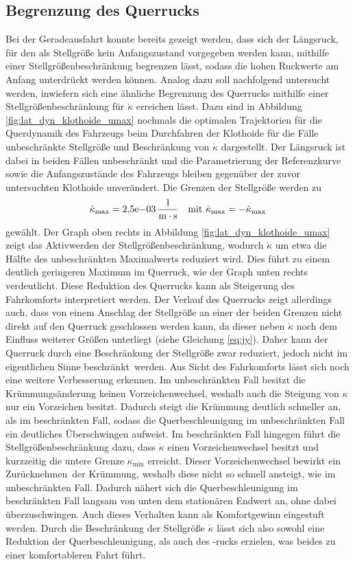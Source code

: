 \subsection{Begrenzung des Querrucks}
Bei der Geradeausfahrt konnte bereits gezeigt werden, dass sich der Längsruck, für den als Stellgröße kein Anfangszustand vorgegeben werden kann, mithilfe einer Stellgrößenbeschränkung begrenzen lässt, sodass die hohen Ruckwerte am Anfang unterdrückt werden können. Analog dazu soll nachfolgend untersucht werden, inwiefern sich eine ähnliche Begrenzung des Querrucks mithilfe einer Stellgrößenbeschränkung für $\dot{\kappa}$ erreichen lässt. Dazu sind in Abbildung \ref{fig:lat_dyn_klothoide_umax} nochmals die optimalen Trajektorien für die Querdynamik des Fahrzeugs beim Durchfahren der Klothoide für die Fälle unbeschränkte Stellgröße und Beschränkung von $\dot{\kappa}$ dargestellt. Der Längsruck ist dabei in beiden Fällen unbeschränkt und die Parametrierung der Referenzkurve sowie die Anfangszustände des Fahrzeugs bleiben gegenüber der zuvor untersuchten Klothoide unverändert. Die Grenzen der Stellgröße werden zu 
\begin{equation}
	\dot{\kappa}_{\textrm{max}} = 2{,}5\textrm{e}{-03}\,\mathrm{\frac{\mathrm{1}}{\mathrm{m\cdot s}}} \quad\textrm{mit~} \dot{\kappa}_{\textrm{max}} = -\dot{\kappa}_{\textrm{max}}
\end{equation}
gewählt. Der Graph oben rechts in Abbildung \ref{fig:lat_dyn_klothoide_umax} zeigt das Aktivwerden der Stellgrößenbeschränkung, wodurch $\dot{\kappa}$ um etwa die Hälfte des unbeschränkten Maximalwerts reduziert wird. Dies führt zu einem deutlich geringeren Maximum im Querruck, wie der Graph unten rechts verdeutlicht. Diese Reduktion des Querrucks kann als Steigerung des Fahrkomforts interpretiert werden. Der Verlauf des Querrucks zeigt allerdings auch, dass von einem Anschlag der Stellgröße an einer der beiden Grenzen nicht direkt auf den Querruck geschlossen werden kann, da dieser neben $\dot{\kappa}$ noch dem Einfluss weiterer Größen unterliegt (siehe Gleichung \eqref{eq:jy}). Daher kann der Querruck durch eine Beschränkung der Stellgröße zwar reduziert, jedoch nicht im eigentlichen Sinne \glqq beschränkt\grqq~werden. Aus Sicht des Fahrkomforts lässt sich noch eine weitere Verbesserung erkennen. Im unbeschränkten Fall besitzt die Krümmungsänderung keinen Vorzeichenwechsel, weshalb auch die Steigung von $\kappa$ nur ein Vorzeichen besitzt. Dadurch steigt die Krümmung deutlich schneller an, als im beschränkten Fall, sodass die Querbeschleunigung im unbeschränkten Fall ein deutliches Überschwingen aufweist. Im beschränkten Fall hingegen führt die Stellgrößenbeschränkung dazu, dass $\dot{\kappa}$ einen Vorzeichenwechsel besitzt und kurzzeitig die untere Grenze $\dot{\kappa}_{\textrm{min}}$ erreicht. Dieser Vorzeichenwechsel bewirkt ein \glqq Zurücknehmen\grqq~der Krümmung, weshalb diese nicht so schnell ansteigt, wie im unbeschränkten Fall. Dadurch nähert sich die Querbeschleunigung im beschränkten Fall langsam von unten dem stationären Endwert an, ohne dabei überzuschwingen. Auch dieses Verhalten kann als Komfortgewinn eingestuft werden. Durch die Beschränkung der Stellgröße $\dot{\kappa}$ lässt sich also sowohl eine Reduktion der Querbeschleunigung, als auch des -rucks erzielen, was beides zu einer komfortableren Fahrt führt.
